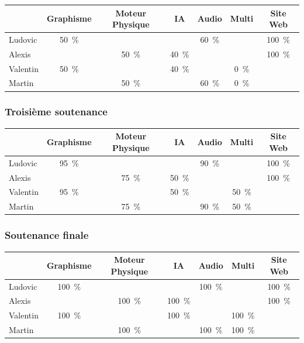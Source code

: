 \documentclass[12pt,a4paper]{article}
\begin{document}
 \begin{tabular}{|l|c|c|c|c|c|c|}
            \hline
                                  & Graphisme & Moteur Physique & IA & Audio & Multi & Site Web \\ \hline
            Ludovic        &   50~\%   & &   & 60~\%& &  100~\% \\ \hline
            Alexis           &       &  50~\%   &   40~\% & &    &  100~\%   \\ \hline
            Valentin        &   50~\%     &   &40~\%  &&   0~\%  &             \\ \hline
           Martin           &      &        50~\%    & &  60~\%  &0~\%  &    \\ \hline
            
        \end{tabular}

            \subsubsection{Troisième soutenance}
 \begin{tabular}{|l|c|c|c|c|c|c|}
            \hline
                                                          & Graphisme & Moteur Physique & IA & Audio & Multi & Site Web \\ \hline
            Ludovic        &   95~\%   & &   & 90~\%& &  100~\% \\ \hline
            Alexis           &       &  75~\%   &   50~\% &  &    &  100~\%   \\ \hline
            Valentin        &  95~\%     &   &50~\%  & &   50~\%  &             \\ \hline
           Martin           &      &        75~\%    & &  90~\%  &50~\%  &    \\ \hline
            
        \end{tabular}

            \subsubsection{Soutenance finale}

 \begin{tabular}{|l|c|c|c|c|c|c|}
            \hline
                           & Graphisme & Moteur Physique & IA & Audio & Multi & Site Web \\ \hline
            Ludovic        &   100~\%   & &   & 100~\%& &  100~\% \\ \hline
            Alexis           &       &  100~\%   &   100~\% &  &    &  100~\%   \\ \hline
            Valentin        &  100~\%     &   &100~\%  &&   100~\%  &             \\ \hline
           Martin           &      &        100~\%    & &  100~\%  &100~\%  &    \\ \hline
        \end{tabular}
\newpage
\end{document}
